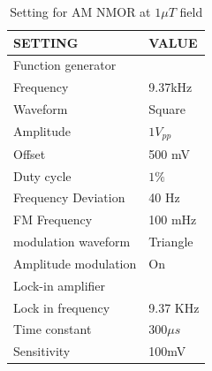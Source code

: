 \documentclass[12pt]{report}
\begin{document}
\begin{itemize}
\begin{table}[h]
\begin{tabular}{|l |l|}
\textbf{ SETTING}    & \textbf{VALUE} \\
\hline
Function generator &   \\
\hline
Frequency & 9.37kHz   \\

Waveform    &  Square  \\

Amplitude   &  $1V_{pp}$  \\
Offset  &       500 mV  \\
Duty cycle       &    $1\%$ \\
Frequency Deviation     &   40 Hz  \\
FM Frequency     &   100 mHz  \\
modulation waveform      &    Triangle \\
Amplitude modulation & On \\
\hline
Lock-in amplifier &     \\
\hline
Lock in frequency     & 9.37 KHz \\
Time constant     &  $300\mu s$ \\
Sensitivity      &  100mV  \\
\hline
\end{tabular}
\caption{Setting for AM NMOR at $1\mu T$ field}
\end{table}


\end{itemize}
\end{document}
